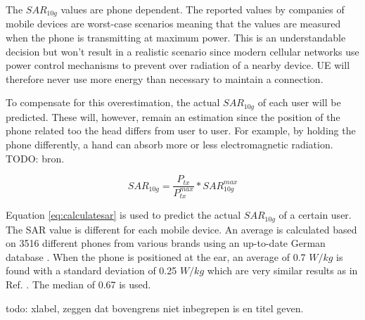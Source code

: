 The $SAR_{10g}$ values are phone dependent. The reported values by companies of mobile devices are worst-case scenarios meaning that the values are measured when the phone is transmitting at maximum power. This is an understandable decision but won't result in a realistic scenario since modern cellular networks use power control mechanisms to prevent over radiation of a nearby device. \gls{UE} will therefore never use more energy than necessary to maintain a connection.

To compensate for this overestimation, the actual $SAR_{10g}$ of each user will be predicted. These will, however, remain an estimation since the position of the phone related too the head differs from user to user. For example, by holding the phone differently, a hand can absorb more or less electromagnetic radiation. TODO: bron.

\begin{equation}
{SAR}_{10g} = \frac{P_{tx}}{P^{max}_{tx}} * {SAR}^{max}_{10g}
\label{eq:calculatesar}
\end{equation}

Equation \ref{eq:calculatesar} is used to predict the actual $SAR_{10g}$  of a certain user. The \gls{SAR} value is different for each mobile device. An average is calculated based on 3516 different phones from various brands using an up-to-date German database \cite{SARDatabase}.
When the phone is positioned at the ear, an average of 0.7 $W/kg$ is found with a standard deviation of 0.25 $W/kg$ which are very similar results as in Ref. \cite{j10.1.1_gati2010duality}. The median of 0.67 is used.



todo: xlabel, zeggen dat bovengrens niet inbegrepen is en titel geven.


